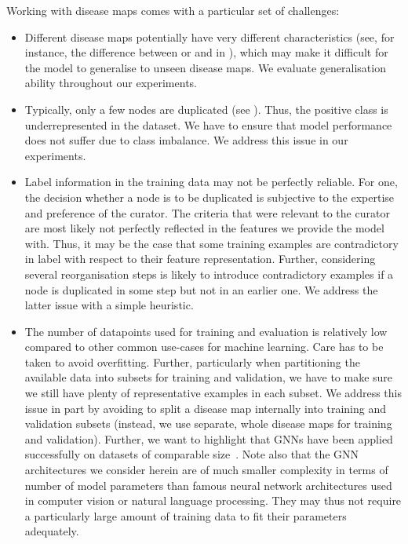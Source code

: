 \documentclass[
	fontsize=10pt, %
	twoside=true, %
	secnumdepth=1, %
  toc=indentunnumbered %
]{kaobook}
\begin{document}
Working with disease maps comes with a particular set of challenges:
\begin{itemize}
\item Different disease maps potentially have very different characteristics
  (see, for instance, the difference between \ADMap{} or \PDMap{} and \ReconMap in
  ), which may make it difficult for the model to
  generalise to unseen disease maps. We evaluate generalisation ability
  throughout our experiments.
\item Typically, only a few nodes are duplicated (see ).
  Thus, the positive class is underrepresented in the dataset. We have to ensure that
  model performance does not suffer due to class imbalance. We address this
  issue in our experiments.
\item Label information in the training data may not be perfectly reliable.
  For one, the decision whether a node is to be duplicated is
  subjective to the expertise and preference of the curator. The criteria that
  were relevant to the curator are most likely not perfectly reflected in the
  features we provide the model with.
  Thus, it may be the case that some
  training examples are contradictory in label with respect to their feature
  representation. Further, considering several reorganisation steps is likely to
  introduce contradictory examples if a node is duplicated in some step but not
  in an earlier one. We address the latter issue with a simple heuristic.
\item The number of datapoints used for training and evaluation is relatively
  low compared to other common use-cases for machine learning. Care has to be
  taken to avoid overfitting. Further, particularly when partitioning the
  available data into subsets for training and validation, we have to make sure we
  still have plenty of representative examples in each subset. We address this
  issue in part by avoiding to split a disease map internally into training and
  validation subsets (instead, we use separate, whole disease maps for training and
  validation). Further, we want to highlight that GNNs have been applied
  successfully on datasets of comparable size~\cite{schulte-sasse_IntegrationMultiomicsData_2021}. Note also that the GNN
  architectures we consider herein are of much smaller complexity in terms of
  number of model parameters than famous neural network architectures used in
  computer vision or natural language processing. They may thus not require a
  particularly large amount of training data to fit their parameters adequately.
\end{itemize}
\end{document}
